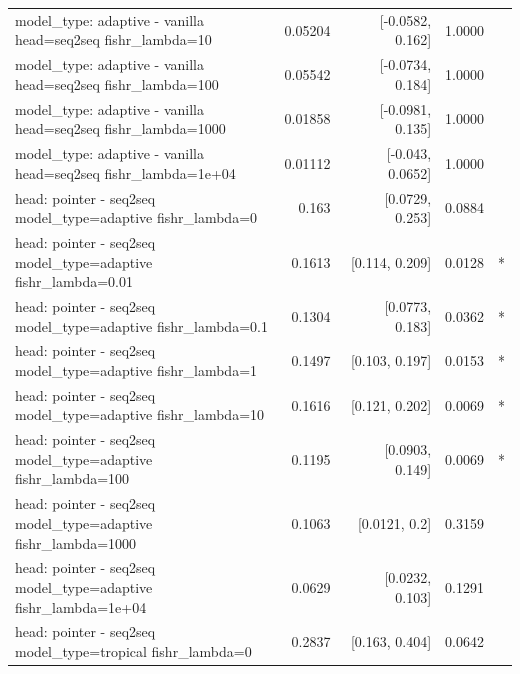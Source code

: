 \documentclass[10pt]{article}
\makeatletter
\newcommand{\stackcell}[1]{\begin{tabular}[t]{@{}l@{}}#1\end{tabular}}
\makeatother
\begin{document}
{\begin{longtable}{lrrrl}
\stackcell{model\_type: adaptive - vanilla\\\footnotesize head=seq2seq fishr\_lambda=10 } & 0.05204 & [-0.0582, 0.162] & 1.0000 & \\
\stackcell{model\_type: adaptive - vanilla\\\footnotesize head=seq2seq fishr\_lambda=100 } & 0.05542 & [-0.0734, 0.184] & 1.0000 & \\
\stackcell{model\_type: adaptive - vanilla\\\footnotesize head=seq2seq fishr\_lambda=1000 } & 0.01858 & [-0.0981, 0.135] & 1.0000 & \\
\stackcell{model\_type: adaptive - vanilla\\\footnotesize head=seq2seq fishr\_lambda=1e+04 } & 0.01112 & [-0.043, 0.0652] & 1.0000 & \\
\stackcell{head: pointer - seq2seq\\\footnotesize model\_type=adaptive fishr\_lambda=0 } & 0.163 & [0.0729, 0.253] & 0.0884 & \\
\stackcell{head: pointer - seq2seq\\\footnotesize model\_type=adaptive fishr\_lambda=0.01 } & 0.1613 & [0.114, 0.209] & 0.0128 & *\\
\stackcell{head: pointer - seq2seq\\\footnotesize model\_type=adaptive fishr\_lambda=0.1 } & 0.1304 & [0.0773, 0.183] & 0.0362 & *\\
\stackcell{head: pointer - seq2seq\\\footnotesize model\_type=adaptive fishr\_lambda=1 } & 0.1497 & [0.103, 0.197] & 0.0153 & *\\
\stackcell{head: pointer - seq2seq\\\footnotesize model\_type=adaptive fishr\_lambda=10 } & 0.1616 & [0.121, 0.202] & 0.0069 & *\\
\stackcell{head: pointer - seq2seq\\\footnotesize model\_type=adaptive fishr\_lambda=100 } & 0.1195 & [0.0903, 0.149] & 0.0069 & *\\
\stackcell{head: pointer - seq2seq\\\footnotesize model\_type=adaptive fishr\_lambda=1000 } & 0.1063 & [0.0121, 0.2] & 0.3159 & \\
\stackcell{head: pointer - seq2seq\\\footnotesize model\_type=adaptive fishr\_lambda=1e+04 } & 0.0629 & [0.0232, 0.103] & 0.1291 & \\
\stackcell{head: pointer - seq2seq\\\footnotesize model\_type=tropical fishr\_lambda=0 } & 0.2837 & [0.163, 0.404] & 0.0642 & \\

\end{longtable}}
\end{document}
